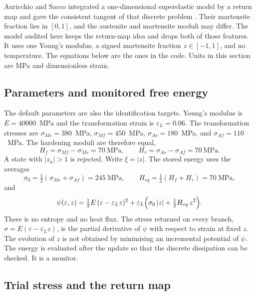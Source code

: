 \documentclass[10pt,a4paper]{article}
\begin{document}
Auricchio and Sacco integrated a one-dimensional superelastic model by a return map and gave the consistent tangent of that discrete problem \cite{auricchio1997}. Their martensite fraction lies in $[0,1]$, and the austenite and martensite moduli may differ. The model audited here keeps the return-map idea and drops both of those features. It uses one Young's modulus, a signed martensite fraction $z\in[-1,1]$, and no temperature. The equations below are the ones in the code. Units in this section are MPa and dimensionless strain.

\subsection{Parameters and monitored free energy}
\label{sec:params}

The default parameters are also the identification targets. Young's modulus is $E=40000$~MPa and the transformation strain is $\varepsilon_L=0.06$. The transformation stresses are $\sigma_{Ms}=380$~MPa, $\sigma_{Mf}=450$~MPa, $\sigma_{As}=180$~MPa, and $\sigma_{Af}=110$~MPa. The hardening moduli are therefore equal,
\begin{equation}
  H_f=\sigma_{Mf}-\sigma_{Ms}=70~\mathrm{MPa},
  \qquad
  H_r=\sigma_{As}-\sigma_{Af}=70~\mathrm{MPa}.
\end{equation}
A state with $|z_n|>1$ is rejected. Write $\xi=|z|$. The stored energy uses the averages
\begin{equation}
  \sigma_0=\tfrac12(\sigma_{Ms}+\sigma_{Af})=245~\mathrm{MPa},
  \qquad
  H_{eq}=\tfrac12(H_f+H_r)=70~\mathrm{MPa},
\end{equation}
and
\begin{equation}
  \label{eq:psi}
  \psi(\varepsilon,z)
  =\tfrac12 E\,(\varepsilon-\varepsilon_L z)^2
  +\varepsilon_L\Bigl(\sigma_0\,|z|+\tfrac12 H_{eq}\,z^2\Bigr).
\end{equation}
There is no entropy and no heat flux. The stress returned on every branch, $\sigma=E(\varepsilon-\varepsilon_L z)$, is the partial derivative of $\psi$ with respect to strain at fixed $z$. The evolution of $z$ is not obtained by minimising an incremental potential of $\psi$. The energy is evaluated after the update so that the discrete dissipation can be checked. It is a monitor.

\subsection{Trial stress and the return map}
\label{sec:return}
\end{document}
